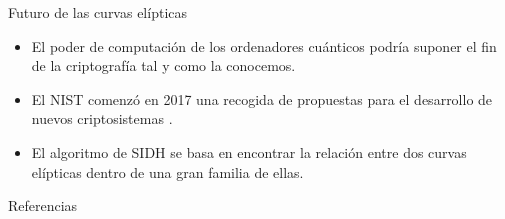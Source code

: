 \documentclass[spanish]{beamer}
\begin{document}
\begin{frame}[fragile]{Futuro de las curvas elípticas}
  \begin{itemize}
    \item El poder de computación de los ordenadores cuánticos podría suponer el fin de la criptografía tal y como la conocemos. %
    \item El NIST comenzó en 2017 una recogida de propuestas para el desarrollo de nuevos criptosistemas \parencite{computer_security_division_call_2017}. %
    \item El algoritmo de SIDH \parencite{yang_towards_2011} se basa en encontrar la relación entre dos curvas elípticas dentro de una gran familia de ellas.
    \end{itemize}
\end{frame}


\begin{frame}[t,allowframebreaks]{Referencias}
  \printbibliography[heading=none]
\end{frame}
\end{document}
